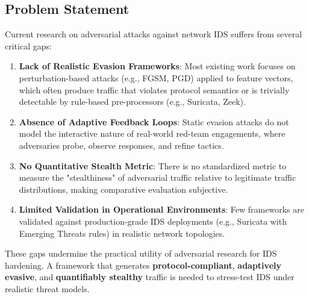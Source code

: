 \documentclass[review]{elsarticle}
\begin{document}
\subsection{Problem Statement}
Current research on adversarial attacks against network IDS suffers from several critical gaps:

\begin{enumerate}
\item \textbf{Lack of Realistic Evasion Frameworks}: Most existing work focuses on perturbation-based attacks (e.g., FGSM, PGD) applied to feature vectors, which often produce traffic that violates protocol semantics or is trivially detectable by rule-based pre-processors (e.g., Suricata, Zeek).
\item \textbf{Absence of Adaptive Feedback Loops}: Static evasion attacks do not model the interactive nature of real-world red-team engagements, where adversaries probe, observe responses, and refine tactics.
\item \textbf{No Quantitative Stealth Metric}: There is no standardized metric to measure the "stealthiness" of adversarial traffic relative to legitimate traffic distributions, making comparative evaluation subjective.
\item \textbf{Limited Validation in Operational Environments}: Few frameworks are validated against production-grade IDS deployments (e.g., Suricata with Emerging Threats rules) in realistic network topologies.
\end{enumerate}

These gaps undermine the practical utility of adversarial research for IDS hardening. A framework that generates \textbf{protocol-compliant}, \textbf{adaptively evasive}, and \textbf{quantifiably stealthy} traffic is needed to stress-test IDS under realistic threat models.
\end{document}
